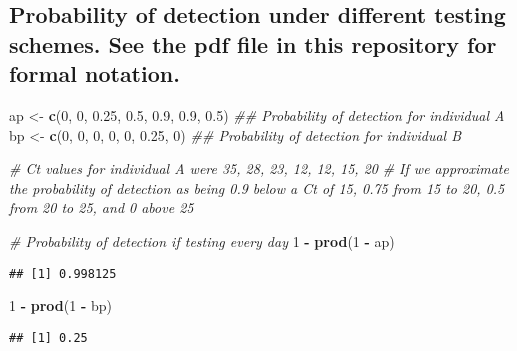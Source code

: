 \documentclass[
]{article}
\author{}
\date{\vspace{-2.5em}}
\newenvironment{Shaded}{\begin{snugshade}}{\end{snugshade}}
\newcommand{\CommentTok}[1]{\textcolor[rgb]{0.56,0.35,0.01}{\textit{#1}}}
\newcommand{\DecValTok}[1]{\textcolor[rgb]{0.00,0.00,0.81}{#1}}
\newcommand{\FloatTok}[1]{\textcolor[rgb]{0.00,0.00,0.81}{#1}}
\newcommand{\KeywordTok}[1]{\textcolor[rgb]{0.13,0.29,0.53}{\textbf{#1}}}
\newcommand{\NormalTok}[1]{#1}
\newcommand{\OperatorTok}[1]{\textcolor[rgb]{0.81,0.36,0.00}{\textbf{#1}}}
\newcommand{\StringTok}[1]{\textcolor[rgb]{0.31,0.60,0.02}{#1}}
\begin{document}
\hypertarget{probability-of-detection-under-different-testing-schemes.-see-the-pdf-file-in-this-repository-for-formal-notation.}{%
\subsection{Probability of detection under different testing schemes.
See the pdf file in this repository for formal
notation.}\label{probability-of-detection-under-different-testing-schemes.-see-the-pdf-file-in-this-repository-for-formal-notation.}}

\begin{Shaded}
\begin{Highlighting}[]
\NormalTok{ap <-}\StringTok{ }\KeywordTok{c}\NormalTok{(}\DecValTok{0}\NormalTok{, }\DecValTok{0}\NormalTok{, }\FloatTok{0.25}\NormalTok{, }\FloatTok{0.5}\NormalTok{, }\FloatTok{0.9}\NormalTok{, }\FloatTok{0.9}\NormalTok{, }\FloatTok{0.5}\NormalTok{) }\CommentTok{## Probability of detection for individual A}
\NormalTok{bp <-}\StringTok{ }\KeywordTok{c}\NormalTok{(}\DecValTok{0}\NormalTok{, }\DecValTok{0}\NormalTok{, }\DecValTok{0}\NormalTok{, }\DecValTok{0}\NormalTok{, }\DecValTok{0}\NormalTok{, }\FloatTok{0.25}\NormalTok{, }\DecValTok{0}\NormalTok{) }\CommentTok{## Probability of detection for individual B}

\CommentTok{# Ct values for individual A were 35, 28, 23, 12, 12, 15, 20}
\CommentTok{# If we approximate the probability of detection as being 0.9 below a Ct of 15, 0.75 from 15 to 20, 0.5 from 20 to 25, and 0 above 25}

\CommentTok{# Probability of detection if testing every day}
\DecValTok{1} \OperatorTok{-}\StringTok{ }\KeywordTok{prod}\NormalTok{(}\DecValTok{1} \OperatorTok{-}\StringTok{ }\NormalTok{ap)}
\end{Highlighting}
\end{Shaded}

\begin{verbatim}
## [1] 0.998125
\end{verbatim}

\begin{Shaded}
\begin{Highlighting}[]
\DecValTok{1} \OperatorTok{-}\StringTok{ }\KeywordTok{prod}\NormalTok{(}\DecValTok{1} \OperatorTok{-}\StringTok{ }\NormalTok{bp)}
\end{Highlighting}
\end{Shaded}

\begin{verbatim}
## [1] 0.25
\end{verbatim}
\end{document}
